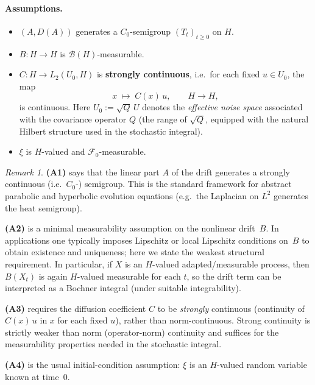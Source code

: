 \documentclass[11pt]{article}
\theoremstyle{definition}
\theoremstyle{remark}
\newtheorem{remark}{Remark}
\begin{document}
\paragraph{Assumptions.}

\begin{itemize}
    \item[\textbf{(A1)}]
        $(A, D(A))$ generates a $C_0$-semigroup $(T_t)_{t \ge 0}$ on $H$.

    \item[\textbf{(A2)}]
        $B \colon H \to H$ is $\mathcal{B}(H)$-measurable.

    \item[\textbf{(A3)}]
        $C \colon H \to L_2(U_0, H)$ is \textbf{strongly continuous},
        i.e.\ for each fixed $u \in U_0$, the map
        \[
            x \;\longmapsto\; C(x)\,u,
            \qquad H \to H,
        \]
        is continuous.
        Here $U_0:=\sqrt{Q}\,U$ denotes the \emph{effective noise space} associated with the
        covariance operator $Q$ (the range of $\sqrt{Q}$, equipped with the natural Hilbert
        structure used in the stochastic integral).

    \item[\textbf{(A4)}]
        $\xi$ is $H$-valued and $\mathcal{F}_0$-measurable.
\end{itemize}

\begin{remark}
\textbf{(A1)} says that the linear part $A$ of the drift generates a
strongly continuous (i.e.\ $C_0$-) semigroup.  This is the standard
framework for abstract parabolic and hyperbolic evolution equations
(e.g.\ the Laplacian on $L^2$ generates the heat semigroup).

\textbf{(A2)} is a minimal measurability assumption on the nonlinear
drift~$B$.  In applications one typically imposes Lipschitz or
local Lipschitz conditions on~$B$ to obtain existence and uniqueness;
here we state the weakest structural requirement.
In particular, if $X$ is an $H$-valued adapted/measurable process, then
$B(X_t)$ is again $H$-valued measurable for each $t$, so the drift term
can be interpreted as a Bochner integral (under suitable integrability).

\textbf{(A3)} requires the diffusion coefficient $C$ to be
\emph{strongly} continuous (continuity of $C(x)\,u$ in $x$ for each
fixed $u$), rather than norm-continuous.  Strong continuity is
strictly weaker than norm (operator-norm) continuity and suffices
for the measurability properties needed in the stochastic integral.

\textbf{(A4)} is the usual initial-condition assumption:
$\xi$ is an $H$-valued random variable known at time~$0$.
\end{remark}
\end{document}

